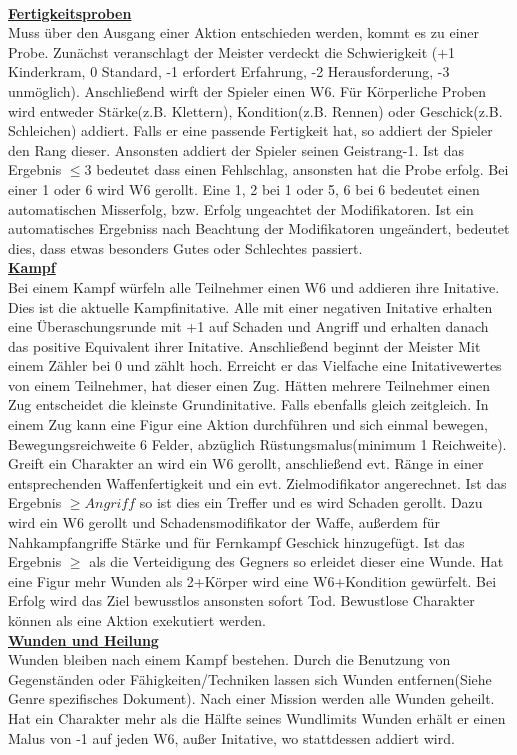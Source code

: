 \documentclass[twoside,a4paper]{minimal}
\begin{document}
\begin{multicols*}{3}
\textbf{\uline{\\Fertigkeitsproben}}
\\Muss über den Ausgang einer Aktion entschieden werden, kommt es zu einer Probe. Zunächst veranschlagt der Meister verdeckt die Schwierigkeit (+1 Kinderkram, 0 Standard, -1 erfordert Erfahrung, -2 Herausforderung, -3 unmöglich). Anschließend wirft der Spieler einen W6. Für Körperliche Proben wird entweder Stärke(z.B. Klettern), Kondition(z.B. Rennen) oder Geschick(z.B. Schleichen) addiert. Falls er eine passende Fertigkeit hat, so addiert der Spieler den Rang dieser. Ansonsten addiert der Spieler seinen Geistrang-1. Ist das Ergebnis $\leq 3$ bedeutet dass einen Fehlschlag, ansonsten hat die Probe erfolg. Bei einer 1 oder 6 wird W6 gerollt. Eine 1, 2 bei 1 oder 5, 6 bei 6 bedeutet einen automatischen Misserfolg, bzw. Erfolg ungeachtet der Modifikatoren. Ist ein automatisches Ergebniss nach Beachtung der Modifikatoren ungeändert, bedeutet dies, dass etwas besonders Gutes oder Schlechtes passiert.
\textbf{\uline{\\Kampf}}
\\Bei einem Kampf würfeln alle Teilnehmer einen W6 und addieren ihre Initative. Dies ist die aktuelle Kampfinitative. Alle mit einer negativen Initative erhalten eine Überaschungsrunde mit +1 auf Schaden und Angriff und erhalten danach das positive Equivalent ihrer Initative. Anschließend beginnt der Meister Mit einem Zähler bei 0 und zählt hoch. Erreicht er das Vielfache eine Initativewertes von einem Teilnehmer, hat dieser einen Zug. Hätten mehrere Teilnehmer einen Zug entscheidet die kleinste Grundinitative. Falls ebenfalls gleich zeitgleich.
In einem Zug kann eine Figur eine Aktion durchführen und sich einmal bewegen, Bewegungsreichweite 6 Felder, abzüglich Rüstungsmalus(minimum 1 Reichweite). Greift ein Charakter an wird ein W6 gerollt, anschließend evt. Ränge in einer entsprechenden Waffenfertigkeit und ein evt. Zielmodifikator angerechnet. Ist das Ergebnis $\geq Angriff$ so ist dies ein Treffer und es wird Schaden gerollt. Dazu wird ein W6 gerollt und Schadensmodifikator der Waffe, außerdem für Nahkampfangriffe Stärke und für Fernkampf Geschick hinzugefügt. Ist das Ergebnis $\geq$ als die Verteidigung des Gegners so erleidet dieser eine Wunde. Hat eine Figur mehr Wunden als 2+Körper wird eine W6+Kondition gewürfelt. Bei Erfolg wird das Ziel bewusstlos ansonsten sofort Tod. Bewustlose Charakter können als eine Aktion exekutiert werden.
\textbf{\uline{\\Wunden und Heilung}}
\\Wunden bleiben nach einem Kampf bestehen. Durch die Benutzung von Gegenständen oder Fähigkeiten/Techniken lassen sich Wunden entfernen(Siehe Genre spezifisches Dokument). Nach einer Mission werden alle Wunden geheilt. Hat ein Charakter mehr als die Hälfte seines Wundlimits Wunden erhält er einen Malus von -1 auf jeden W6, außer Initative, wo stattdessen addiert wird.


\end{multicols*}
\end{document}
